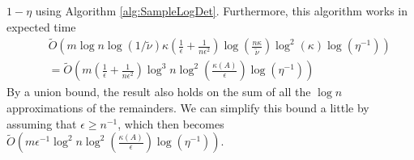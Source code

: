 $1-\eta$ using Algorithm \ref{alg:SampleLogDet}. Furthermore, this
algorithm works in expected time 
\begin{eqnarray*}
 &  & \tilde{O}\left(m\log n\log\left(1/\tilde{\nu}\right)\kappa\left(\frac{1}{\epsilon}+\frac{1}{n\epsilon^{2}}\right)\log\left(\frac{n\kappa}{\tilde{\nu}}\right)\log^{2}\left(\kappa\right)\log\left(\eta^{-1}\right)\right)\\
 &  & =\tilde{O}\left(m\left(\frac{1}{\epsilon}+\frac{1}{n\epsilon^{2}}\right)\log^{3}n\log^{2}\left(\frac{\kappa\left(A\right)}{\epsilon}\right)\log\left(\eta^{-1}\right)\right)
\end{eqnarray*}
By a union bound, the result also holds on the sum of all the $\log n$
approximations of the remainders. We can simplify this bound a little
by assuming that $\epsilon\geq n^{-1}$, which then becomes $\tilde{O}\left(m\epsilon^{-1}\log^{2}n\log^{2}\left(\frac{\kappa\left(A\right)}{\epsilon}\right)\log\left(\eta^{-1}\right)\right)$. 
